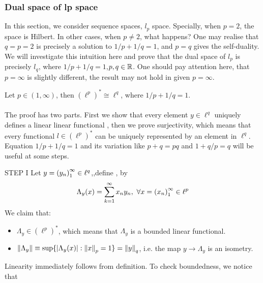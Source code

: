 \subsubsection{Dual space of lp space}\label{lp dual}
In this section, we consider sequence spaces, $l_p$ space. Specially, when $p=2$, the space is Hilbert. In other cases,  when $p\not=2$, what happens? One may realise that $q=p=2$ is precisely a solution to $1/p+1/q=1$, and $p=q$ gives the self-duality. We will investigate this intuition here and prove that the dual space of $l_p$ is precisely $l_q$, where $1/p+1/q=1$,$p,q\in\mathbb{R}$. One should pay attention here, that $p=\infty$ is slightly different, the result may not hold in given $p=\infty$.

\begin{theorem}\rm\nextline
	Let $p\in (1,\infty)$, then $(\ell^p)^*\cong\ell^q $, where $1/p+1/q=1$.\\
	\prf\\
	The proof has two parts. First we show that every element  $y\in\ell^q$ uniquely defines a linear linear functional , then we prove surjectivity, which means that every functional $l\in(\ell^p)^*$ can be uniquely represented by an element in $\ell^q$. Equation $1/p+1/q=1$ and its variation like $p+q=pq$ and  $1+q/p=q$ will be useful at some steps.
	\begin{pf}{STEP I}{}
	Let $y=\left({y_n}\right)_1^\infty\in\ell^q$,,define , by 
	$$\Lambda_y(x)=\sum_{k=1}^{\infty}x_ny_n,\,\,\forall x=\left({x_n}\right)_1^\infty\in\ell^p$$
	We claim that:\begin{itemize}
		\item $\Lambda_y\in(\ell^p)^*$, which means that $\Lambda_y$ is a bounded linear functional.
		\item $\left\|{\Lambda_y}\right\|\equiv\sup\{|\Lambda_y(x)|:\left\|{x}\right\|_p=1\}=\left\|{y}\right\|_q$, i.e. the map $y\rightarrow\Lambda_y$ is an isometry.
	\end{itemize}
	Linearity immediately follows from definition. To check boundedness, we notice that
	\begin{comment}
	\begin{equation}
		\begin{split}
		\left|\Lambda_y(x)\right|&=\left|\sum_{k=1}^{\infty}x_ny_n\right|\\
		&\leq\sum_{k=1}^{\infty}|x_ny_n|\\
		&\leq\norm{xy}_1\\
		\text{(Hölder)}\quad&\leq\norm{x}_p\norm{y}_q
		\end{split}

\end{comment}
\end{pf}
\end{theorem}
